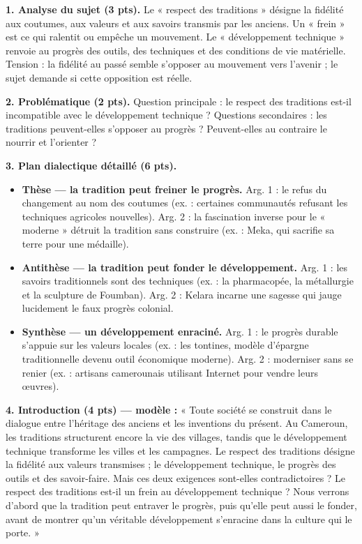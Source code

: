 \documentclass[11pt]{article}
\begin{document}
\begin{corrige}
\textbf{1. Analyse du sujet (3 pts).} Le « respect des traditions » désigne la fidélité aux coutumes, aux valeurs et aux savoirs transmis par les anciens. Un « frein » est ce qui ralentit ou empêche un mouvement. Le « développement technique » renvoie au progrès des outils, des techniques et des conditions de vie matérielle. Tension : la fidélité au passé semble s'opposer au mouvement vers l'avenir ; le sujet demande si cette opposition est réelle.

\textbf{2. Problématique (2 pts).} Question principale : le respect des traditions est-il incompatible avec le développement technique ? Questions secondaires : les traditions peuvent-elles s'opposer au progrès ? Peuvent-elles au contraire le nourrir et l'orienter ?

\textbf{3. Plan dialectique détaillé (6 pts).}
\begin{itemize}
\item \textbf{Thèse — la tradition peut freiner le progrès.} Arg. 1 : le refus du changement au nom des coutumes (ex. : certaines communautés refusant les techniques agricoles nouvelles). Arg. 2 : la fascination inverse pour le « moderne » détruit la tradition sans construire (ex. : Meka, qui sacrifie sa terre pour une médaille).
\item \textbf{Antithèse — la tradition peut fonder le développement.} Arg. 1 : les savoirs traditionnels sont des techniques (ex. : la pharmacopée, la métallurgie et la sculpture de Foumban). Arg. 2 : Kelara incarne une sagesse qui jauge lucidement le faux progrès colonial.
\item \textbf{Synthèse — un développement enraciné.} Arg. 1 : le progrès durable s'appuie sur les valeurs locales (ex. : les tontines, modèle d'épargne traditionnelle devenu outil économique moderne). Arg. 2 : moderniser sans se renier (ex. : artisans camerounais utilisant Internet pour vendre leurs œuvres).
\end{itemize}

\textbf{4. Introduction (4 pts) — modèle :} « Toute société se construit dans le dialogue entre l'héritage des anciens et les inventions du présent. Au Cameroun, les traditions structurent encore la vie des villages, tandis que le développement technique transforme les villes et les campagnes. Le respect des traditions désigne la fidélité aux valeurs transmises ; le développement technique, le progrès des outils et des savoir-faire. Mais ces deux exigences sont-elles contradictoires ? Le respect des traditions est-il un frein au développement technique ? Nous verrons d'abord que la tradition peut entraver le progrès, puis qu'elle peut aussi le fonder, avant de montrer qu'un véritable développement s'enracine dans la culture qui le porte. »


\end{corrige}
\end{document}
